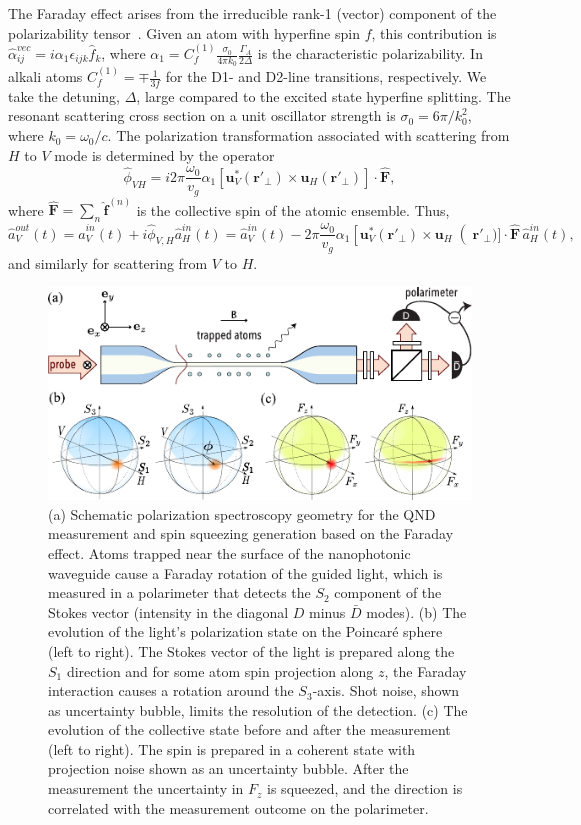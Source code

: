 \documentclass[preprint,aps,pra,onecolumn,superscriptaddress]{revtex4-1} %
\newcommand{\mbf}[1]{\mathbf{#1}}
\newcommand{\Poincare}{Poincar\'e\xspace}
\begin{document}
The Faraday effect arises from the irreducible rank-1 (vector) component of the polarizability tensor~\cite{Deutsch2010a}.  Given an atom with hyperfine spin $f$, this contribution is $\hat{\alpha}^{vec}_{ij} = i \alpha_1 \epsilon_{ijk} \hat{f}_k$, where $\alpha_1 = C^{(1)}_{f}\frac{\sigma_0}{4\pi k_0}\frac{\Gamma_A}{2\Delta} $ is the characteristic polarizability.  In alkali atoms $C^{(1)}_f=\mp\frac{1}{3f}$ for the D1- and D2-line transitions, respectively.  We take the detuning, $ \Delta $, large compared to the excited state hyperfine splitting.  The resonant scattering cross section on a unit oscillator strength is $\sigma_0 = 6\pi/k_0^2$, where $k_0=\omega_0/c$.  The polarization transformation associated with scattering from $H$ to $V$ mode is determined by the operator
\begin{equation}
\hat{\phi}_{VH} = i 2\pi \frac{\omega_0}{v_g}\alpha_1 \left[ \mbf{u}^*_V (\mbf{r}'_\perp) \times  \mbf{u}_{H} (\mbf{r}'_\perp) \right] \cdot \hat{\mbf{F}},
\end{equation}
where $\hat{\mbf{F}}=\sum_n \hat{\mbf{f}}^{(n)}$ is the collective spin of the atomic ensemble.  Thus,
\begin{equation}\label{eq:aoutain}
\hat{a}^{out}_V(t) = \hat{a}^{in}_V(t)  +i  \hat{\phi}_{V,H} \hat{a}^{in}_{H}(t)= \hat{a}^{in}_V(t)  - 2\pi \frac{\omega_0}{v_g}\alpha_1 \left[ \mbf{u}^*_V (\mbf{r}'_\perp) \times  \mbf{u}_{H}\right(\mbf{r}'_\perp)]  \cdot \hat{\mbf{F}}\, \hat{a}^{in}_{H}(t),
\end{equation}
 and similarly for scattering from $V$ to $H$.

\begin{figure}[htb]
\centering
  \includegraphics[width=.45\textwidth]{fig/FaradaySchematics}
  \caption{(a) Schematic polarization spectroscopy geometry for the QND measurement and spin squeezing generation based on the Faraday effect.  Atoms trapped near the surface of the nanophotonic waveguide cause a Faraday rotation of the guided light, which is measured in a polarimeter that detects the $S_2$ component of the Stokes vector (intensity in the diagonal $D$ minus $\bar{D}$ modes).  (b) The evolution of the light's polarization state on the \Poincare sphere  (left to right).  The Stokes vector of the light is prepared along the $S_1$ direction and for some atom spin projection along $z$, the Faraday interaction causes a rotation around the $S_3$-axis.  Shot noise, shown as uncertainty bubble, limits the resolution of the detection. (c) The evolution of the collective state before and after the measurement (left to right).  The spin is prepared in a coherent state with projection noise shown as an uncertainty bubble.  After the measurement the uncertainty in $F_z$ is squeezed, and the direction is correlated with the measurement outcome on the polarimeter. }\label{fig:spinsqueezingschematic}
\end{figure}
\end{document}

